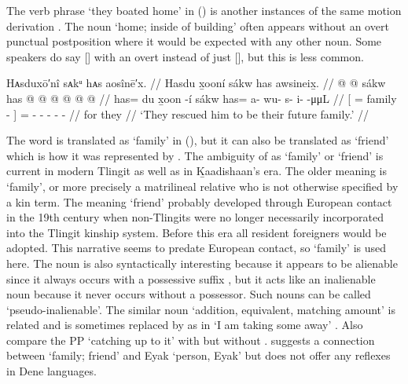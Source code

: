 The verb phrase  ‘they boated home’ in (\lastx) is another instances of the same motion derivation .
The noun  ‘home; inside of building’ often appears without an overt punctual  postposition where it would be expected with any other noun.
Some speakers do say  [] with an overt  instead of just  [], but this is less common.

\ex\label{ex:106-12-rescued}%
%
\begingl
	\glpreamble	Hᴀsduxō′nî sᴀkᵘ hᴀs aosînē′x. //
	\glpreamble	Hasdu x̱ooní sákw has awsineix̱. //
	\gla	{}  @ {}  @ {} sákw {}
		has @  @ {} @ {} @ {} @ {} @ {}  //
	\glb	{} has= du x̱oon -í sákw {} 
		has= a- wu- s- i-  -μμL //
	\glc	{}[ =  family -  {}]
		= - - - -  - //
	\gld	{}  {}  {} for {}
		they  {} {} {} {} {} //
	\glft	‘They rescued him to be their future family.’
		//
\endgl
\xe

The word  is translated as ‘family’ in (\lastx), but it can also be translated as ‘friend’ which is how it was represented by \citeauthor{swanton:1909}.
The ambiguity of  as ‘family’ or ‘friend’ is current in modern Tlingit as well as in Ḵaadishaan’s era.
The older meaning is ‘family’, or more precisely a matrilineal relative who is not otherwise specified by a kin term.
The meaning ‘friend’ probably developed through European contact in the 19th century when non-Tlingits were no longer necessarily incorporated into the Tlingit kinship system.
Before this era all resident foreigners would be adopted.
This narrative seems to predate European contact, so ‘family’ is used here.
The noun  is also syntactically interesting because it appears to be alienable since it always occurs with a possessive suffix , but it acts like an inalienable noun because it never occurs without a possessor.
Such nouns can be called ‘pseudo-inalienable’.
The similar noun  ‘addition, equivalent, matching amount’ is related and is sometimes replaced by  as in  ‘I am taking some away’ \parencite[f02/12]{leer:1973}.
Also compare the PP  ‘catching up to it’ with  but without .
\textcite[70]{leer:1978b} suggests a connection between  ‘family; friend’ and Eyak  ‘person, Eyak’ \parencite[186]{krauss:1970} but does not offer any reflexes in Dene languages.

